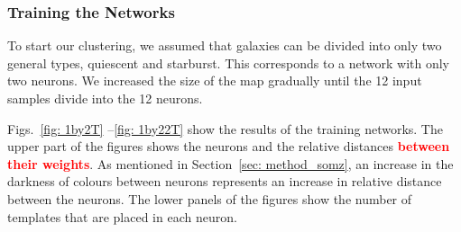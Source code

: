         \subsubsection{Training the Networks}
        \label{sec: 1Dt}
            To start our clustering, we assumed that galaxies can be divided into only two general types, quiescent and starburst.
            This corresponds to a network with only two neurons.
            We increased the size of the map gradually until the 12 input samples divide into the 12 neurons. 
        
            Figs.~\ref{fig: 1by2T} --\ref{fig: 1by22T} show the results of the training networks.  %
            The upper part of the figures shows the neurons and the relative distances \textbf{\textcolor{red}{between their weights}}. 
            As mentioned in Section~\ref{sec: method_somz}, an increase in the darkness of colours between neurons represents an increase in relative distance between the neurons.
            The lower panels of the figures show the number of  templates that are placed in each neuron. 

